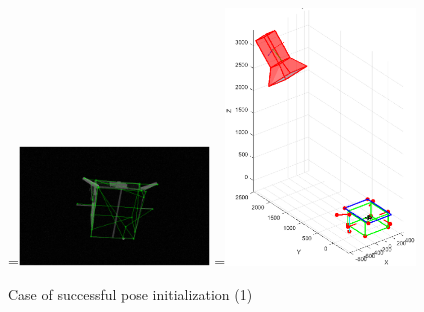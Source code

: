 \begin{figure}[htpb]
  =\hbox{\includegraphics[width=0.45\textwidth]{gfx/PoseDetermination/trial49modelMap.eps}}%
  =\hbox{\includegraphics[width=0.45\textwidth]{gfx/PoseDetermination/cameraWRTSC49.eps}}%
  {\,} \hfill
   \hfill
   \hfill
  {\,}
  \caption{Case of successful pose initialization (1)}
  \label{fig:EVVAI1}
\end{figure}

